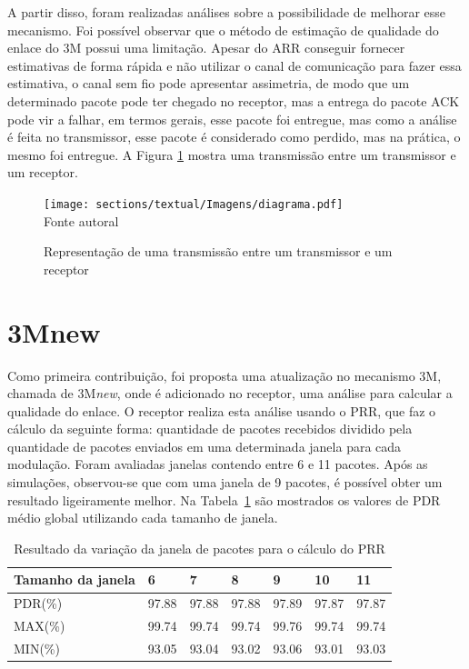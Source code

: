 A partir disso, foram realizadas análises sobre a possibilidade de melhorar esse mecanismo. Foi possível observar que o método de estimação de qualidade do enlace do 3M \cite{gomes2020improving} possui uma limitação. Apesar do ARR conseguir fornecer estimativas de forma rápida e não utilizar o canal de comunicação para fazer essa estimativa, o canal sem fio pode apresentar assimetria, de modo que um determinado pacote pode ter chegado no receptor, mas a entrega do pacote ACK pode vir a falhar, em termos gerais, esse pacote foi entregue, mas como a análise é feita no transmissor, esse pacote é considerado como perdido, mas na prática, o mesmo foi entregue. A Figura \ref{fig:transm} mostra uma transmissão entre um transmissor e um receptor. 

\begin{figure}[H]
    \caption{\footnotesize Representação de uma transmissão entre um transmissor e um receptor}
    \centering
    \texttt{[image: sections/textual/Imagens/diagrama.pdf]}\\
    Fonte autoral
    \label{fig:transm}
\end{figure}

\section{3Mnew}

Como primeira contribuição, foi proposta uma atualização no mecanismo 3M, chamada de 3M\textit{new}, onde é adicionado no receptor, uma análise para calcular a qualidade do enlace. O receptor realiza esta análise usando o PRR, que faz o cálculo da seguinte forma: quantidade de pacotes recebidos dividido pela quantidade de pacotes enviados em uma determinada janela para cada modulação. Foram avaliadas janelas contendo entre 6 e 11 pacotes. Após as simulações, observou-se que com uma janela de 9 pacotes, é possível obter um resultado ligeiramente melhor. 
Na Tabela~\ref{tabela:janela} são mostrados os valores de PDR médio global utilizando cada tamanho de janela.


\begin{table}[H]
\centering
\begin{tabular}{|l|l|l|l|l|l|l|}
\hline
Tamanho da janela   & 6  & 7  & 8  & 9  & 10  & 11  \\ \hline
PDR(\%) & 97.88  & 97.88  & 97.88  & 97.89  & 97.87   & 97.87   \\ \hline
MAX(\%) & 99.74  & 99.74  & 99.74  & 99.76  & 99.74   & 99.74   \\ \hline
MIN(\%) & 93.05  & 93.04  & 93.02  & 93.06  & 93.01   & 93.03   \\ \hline
\end{tabular}
\caption{Resultado da variação da janela de pacotes para o cálculo do PRR}
\label{tabela:janela}
\end{table}

